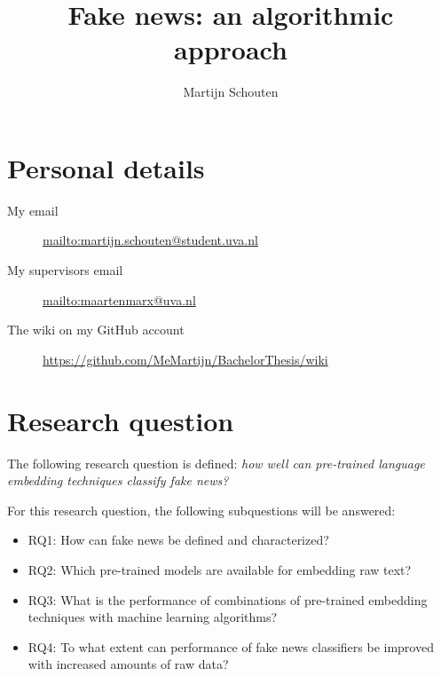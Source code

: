 \documentclass[a4paper,pdf]{article} %
\begin{document}
\title{Fake news: an algorithmic approach} %
\author{Martijn Schouten}

\maketitle




\section{Personal details}

\begin{description}
 \item[My email] \url{mailto:martijn.schouten@student.uva.nl }
 \item[My supervisors email] \url{mailto:maartenmarx@uva.nl }
 \item[The wiki on my GitHub account] \url{https://github.com/MeMartijn/BachelorThesis/wiki}
 \end{description} 

\section{Research question}

The following research question is defined: \textit{how well can pre-trained language embedding techniques classify fake news?}

For this research question, the following subquestions will be answered:
\begin{itemize}
  \item RQ1: How can fake news be defined and characterized?
  \item RQ2: Which pre-trained models are available for embedding raw text?
  \item RQ3: What is the performance of combinations of pre-trained embedding techniques with machine learning algorithms?
  \item RQ4: To what extent can performance of fake news classifiers be improved with increased amounts of raw data?
\end{itemize}
\end{document}
